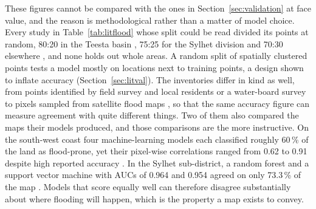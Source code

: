 \documentclass[10pt,a4paper,twocolumn]{article}
\begin{document}
These figures cannot be compared with the ones in Section~\ref{sec:validation} at face value, and the reason is methodological rather than a matter of model choice. Every study in Table~\ref{tab:litflood} whose split could be read divided its points at random, 80:20 in the Teesta basin \citep{islam2021, talukdar2020}, 75:25 for the Sylhet division \citep{rudra2023} and 70:30 elsewhere \citep{islamr2024, adnan2023}, and none holds out whole areas. A random split of spatially clustered points tests a model mostly on locations next to training points, a design shown to inflate accuracy (Section~\ref{sec:litval}). The inventories differ in kind as well, from points identified by field survey and local residents \citep{islam2021, talukdar2020} or a water-board survey \citep{rudra2023} to pixels sampled from satellite flood maps \citep{islamr2024, adnan2023}, so that the same accuracy figure can measure agreement with quite different things. Two of them also compared the maps their models produced, and those comparisons are the more instructive. On the south-west coast four machine-learning models each classified roughly 60\,\% of the land as flood-prone, yet their pixel-wise correlations ranged from 0.62 to 0.91 despite high reported accuracy \citep{adnan2023}. In the Sylhet sub-district, a random forest and a support vector machine with AUCs of 0.964 and 0.954 agreed on only 73.3\,\% of the map \citep{islamr2024}. Models that score equally well can therefore disagree substantially about where flooding will happen, which is the property a map exists to convey.
\end{document}
